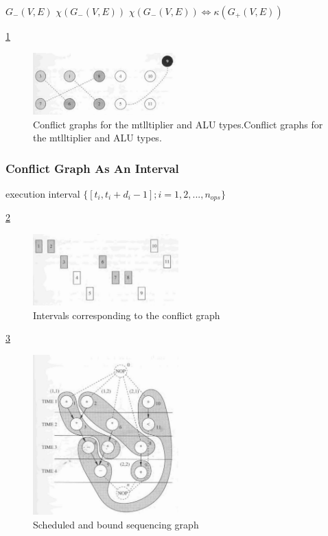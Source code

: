 $G_{-}(V,E)  $
$\chi(G_{-}(V,E))  $
$\chi(G_{-}(V,E))  \Leftrightarrow \kappa(G_{+}(V,E)) $

\ref{fig:Conflict_graphs_for_the_mtlltiplier_and_ALU_types}
\begin{figure}[h]
    \centering
    \includegraphics[width=0.5\textwidth]{Conflict_graphs_for_the_mtlltiplier_and_ALU_types}
    \caption{Conflict graphs for the mtlltiplier and ALU types.Conflict graphs for the mtlltiplier and ALU types. \cite{b1}}
    \label{fig:Conflict_graphs_for_the_mtlltiplier_and_ALU_types}
\end{figure}




\subsubsection{Conflict Graph As An Interval}
execution interval $ \{[t_{i},t_{i}+d_{i}-1];i=1,2,...,n_{ops}\} $

\ref{fig:Intervals_corresponding_to_the_conflict_grap}
\begin{figure}[h]
    \centering
    \includegraphics[width=0.5\textwidth]{Intervals_corresponding_to_the_conflict_grap}
    \caption{ Intervals corresponding to the conflict graph \cite{b1}}
    \label{fig:Intervals_corresponding_to_the_conflict_grap}
\end{figure}


\ref{fig:Scheduled_an_bound_sequencing}
\begin{figure}[h]
    \centering
    \includegraphics[width=0.5\textwidth]{Scheduled_an_bound_sequencing}
    \caption{ Scheduled and bound sequencing graph \cite{b1}}
    \label{fig:Scheduled_an_bound_sequencing}
\end{figure}










